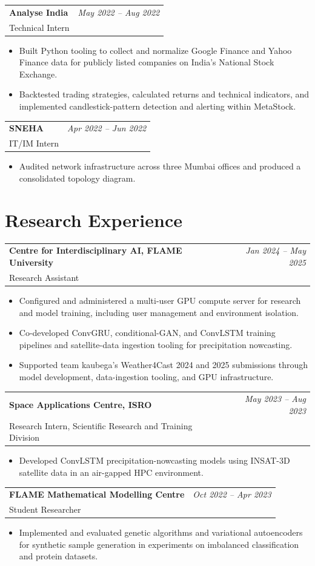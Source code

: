 \documentclass[letterpaper,10pt]{article}
\makeatletter
\newcommand{\cvsection}[2]{%
  \needspace{\dimexpr#1\baselineskip+3\baselineskip\relax}%
  \section{#2}%
}
\newcommand{\experienceentry}[4]{%
  \needspace{5\baselineskip}
  \begin{tabularx}{\linewidth}{@{}X r@{}}
    \textbf{#1} & \textit{\color{muted}#2}\\
    \textcolor{accent}{#3} & \\
  \end{tabularx}
  \vspace{-8pt}
  #4
  \vspace{3pt}
}
\makeatother
\begin{document}
\experienceentry
  {Analyse India}
  {May 2022 -- Aug 2022}
  {Technical Intern}
  {
    \begin{itemize}
      \item Built Python tooling to collect and normalize Google Finance and Yahoo Finance data for publicly listed companies on India's National Stock Exchange.
      \item Backtested trading strategies, calculated returns and technical indicators, and implemented candlestick-pattern detection and alerting within MetaStock.
    \end{itemize}
  }

\experienceentry
  {SNEHA}
  {Apr 2022 -- Jun 2022}
  {IT/IM Intern}
  {
    \begin{itemize}
      \item Audited network infrastructure across three Mumbai offices and produced a consolidated topology diagram.
    \end{itemize}
  }

\cvsection{6}{Research Experience}
\experienceentry
  {Centre for Interdisciplinary AI, FLAME University}
  {Jan 2024 -- May 2025}
  {Research Assistant}
  {
    \begin{itemize}
      \item Configured and administered a multi-user GPU compute server for research and model training, including user management and environment isolation.
      \item Co-developed ConvGRU, conditional-GAN, and ConvLSTM training pipelines and satellite-data ingestion tooling for precipitation nowcasting.
      \item Supported team kaubega's Weather4Cast 2024 and 2025 submissions through model development, data-ingestion tooling, and GPU infrastructure.
    \end{itemize}
  }

\experienceentry
  {Space Applications Centre, ISRO}
  {May 2023 -- Aug 2023}
  {Research Intern, Scientific Research and Training Division}
  {
    \begin{itemize}
      \item Developed ConvLSTM precipitation-nowcasting models using INSAT-3D satellite data in an air-gapped HPC environment.
    \end{itemize}
  }

\experienceentry
  {FLAME Mathematical Modelling Centre}
  {Oct 2022 -- Apr 2023}
  {Student Researcher}
  {
    \begin{itemize}
      \item Implemented and evaluated genetic algorithms and variational autoencoders for synthetic sample generation in experiments on imbalanced classification and protein datasets.
    \end{itemize}
  }
\end{document}
